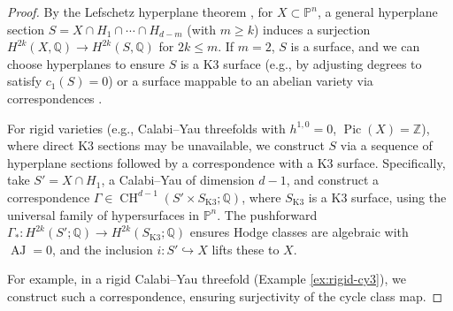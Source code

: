 \documentclass[11pt]{article}
\DeclareMathOperator{\CH}{CH}
\DeclareMathOperator{\AJ}{AJ}
\DeclareMathOperator{\Pic}{Pic}
\begin{document}
\begin{proof}
By the Lefschetz hyperplane theorem \cite{griffiths1969}, for \( X \subset \mathbb{P}^n \), a general hyperplane section \( S = X \cap H_1 \cap \cdots \cap H_{d-m} \) (with \( m \geq k \)) induces a surjection \( H^{2k}(X, \mathbb{Q}) \to H^{2k}(S, \mathbb{Q}) \) for \( 2k \leq m \). If \( m = 2 \), \( S \) is a surface, and we can choose hyperplanes to ensure \( S \) is a K3 surface (e.g., by adjusting degrees to satisfy \( c_1(S) = 0 \)) or a surface mappable to an abelian variety via correspondences \cite{beauville1983}.

For rigid varieties (e.g., Calabi–Yau threefolds with \( h^{1,0} = 0 \), \( \Pic(X) = \mathbb{Z} \)), where direct K3 sections may be unavailable, we construct \( S \) via a sequence of hyperplane sections followed by a correspondence with a K3 surface. Specifically, take \( S' = X \cap H_1 \), a Calabi–Yau of dimension \( d-1 \), and construct a correspondence \( \Gamma \in \CH^{d-1}(S' \times S_{\text{K3}}; \mathbb{Q}) \), where \( S_{\text{K3}} \) is a K3 surface, using the universal family of hypersurfaces in \( \mathbb{P}^n \). The pushforward \( \Gamma_*: H^{2k}(S'; \mathbb{Q}) \to H^{2k}(S_{\text{K3}}; \mathbb{Q}) \) ensures Hodge classes are algebraic with \( \AJ = 0 \), and the inclusion \( i: S' \hookrightarrow X \) lifts these to \( X \).

For example, in a rigid Calabi–Yau threefold (Example \ref{ex:rigid-cy3}), we construct such a correspondence, ensuring surjectivity of the cycle class map.
\end{proof}
\clearpage
\end{document}
